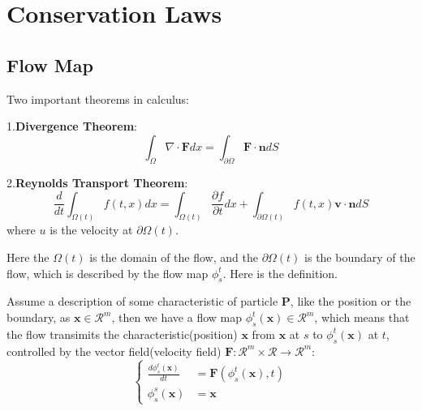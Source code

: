 \newpage
\appendix

\section{Conservation Laws}
\subsection{Flow Map}
\begin{theorem}Two important theorems in calculus:

    1.\textbf{Divergence Theorem}:
    \begin{equation}
        \int_{\Omega} \nabla \cdot \mathbf{F} d x = \int_{\partial \Omega} \mathbf{F} \cdot \mathbf{n} d S
    \end{equation}

    2.\textbf{Reynolds Transport Theorem}:
    \begin{equation}
        \frac{d}{dt}\int_{\Omega(t)} f(t, x) d x = \int_{\Omega (t)} \frac{\partial f}{\partial t} d x + \int_{\partial \Omega (t)} f(t, x) \mathbf{v} \cdot \mathbf{n} d S
    \end{equation}
    where $u$ is the velocity at $\partial \Omega (t)$.
\end{theorem}
Here the $\Omega(t)$ is the domain of the flow, and the $\partial \Omega(t)$ is the boundary of the flow, which is described by the flow map $\phi_s^t$. Here is the definition.
\begin{definition}
    Assume a description of some characteristic of particle $\mathbf{P}$, like the position or the boundary, as $\mathbf{x}\in \mathcal{R}^m$, then we have a flow map $\phi_s^t(\mathbf{x})\in \mathcal{R}^m$, 
    which means that the flow transimits the characteristic(position) $\mathbf{x}$ from $\mathbf{x}$ at $s$ to $\phi_s^t(\mathbf{x})$ at $t$, controlled by the vector field(velocity field) $\mathbf{F}: \mathcal{R}^m\times \mathcal{R}\to \mathcal{R}^m$:
    \begin{equation}\left\{
        \begin{aligned}
            \frac{d\phi_s^t(\mathbf{x})}{dt} &= \mathbf{F}(\phi_s^t(\mathbf{x}), t)\\
            \phi_s^s(\mathbf{x}) &= \mathbf{x}
        \end{aligned}\right.
    \end{equation}
\end{definition}
